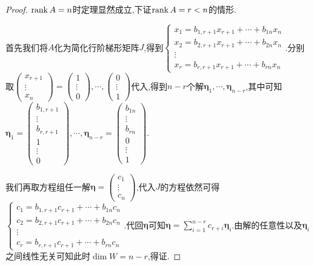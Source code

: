 \documentclass[openany]{book}
\begin{document}
\begin{proof}
    $\operatorname{rank} A=n$时定理显然成立,下证$\operatorname{rank} A=r<n$的情形.
    
    首先我们将$A$化为简化行阶梯形矩阵$J$,得到$\begin{cases}
        x_1=b_{1,r+1}x_{r+1}+\cdots+b_{1n}x_{n}\\
        x_2=b_{2,r+1}x_{r+1}+\cdots+b_{2n}x_{n}\\
        \vdots\\
        x_r=b_{r,r+1}x_{r+1}+\cdots+b_{rn}x_{n}
    \end{cases}$.分别取$\begin{pmatrix}
        x_{r+1}\\\vdots\\x_{n}
    \end{pmatrix}=\begin{pmatrix}
        1\\\vdots\\0
    \end{pmatrix},\cdots,\begin{pmatrix}
        0\\\vdots\\1
    \end{pmatrix}$代入,得到$n-r$个解$\bm{\eta}_1,\cdots,\bm{\eta}_{n-r}$,其中可知$\bm{\eta}_1=\begin{pmatrix}
        b_{1,r+1}\\\vdots\\b_{r,r+1}\\1\\\vdots\\0
    \end{pmatrix},\cdots,\bm{\eta}_{n-r}=\begin{pmatrix}
        b_{1n}\\\vdots\\b_{rn}\\0\\\vdots\\1
    \end{pmatrix}$.

    我们再取方程组任一解$\bm{\eta}=\begin{pmatrix}
        c_1\\\vdots\\c_n
    \end{pmatrix}$,代入$J$的方程依然可得$\begin{cases}
        c_1=b_{1,r+1}c_{r+1}+\cdots+b_{1n}c_{n}\\
        c_2=b_{2,r+1}c_{r+1}+\cdots+b_{2n}c_{n}\\
        \vdots\\
        c_r=b_{r,r+1}c_{r+1}+\cdots+b_{rn}c_{n}
    \end{cases}$.代回$\bm{\eta}$可知$\bm{\eta}=\sum_{i=1}^{n-r}c_{r+i}\bm{\eta}_i$.由解的任意性以及$\bm{\eta}_i$之间线性无关可知此时$\dim W=n-r$,得证.
\end{proof}
\end{document}
